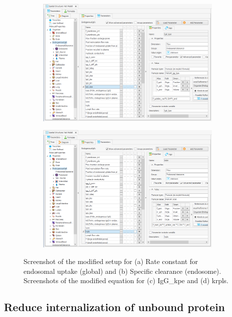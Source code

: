 \documentclass[fleqn,10pt]{physiome}
\begin{document}
\begin{figure}[htb]
\begin{subfigure}{0.49\textwidth}
        \includegraphics[width=\textwidth]{Picture10.png}
        \caption{}
        \label{pic:4c}
    \end{subfigure}
    \hfill
    \begin{subfigure}{0.49\textwidth}
        \includegraphics[width=\textwidth]{Picture11.png}
        \caption{}
        \label{pic:4d}
    \end{subfigure}
    \caption{Screenshot of the modified setup for (a) Rate constant for endosomal uptake (global) and (b) Specific clearance (endosome). Screenshots of the modified equation for (c) IgG\_kpe and (d) krpls.}
    \label{pic4}
\end{figure}



\subsection{Reduce internalization of unbound protein}
\end{document}
